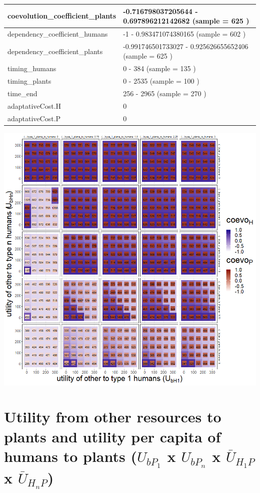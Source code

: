 \documentclass[
]{book}
\begin{document}
\begin{table}[!h]
\begin{tabular}[t]{l|l}
\hline
coevolution\_coefficient\_plants & -0.716798037205644 - 0.697896212142682 (sample = 625 )\\
\hline
dependency\_coefficient\_humans & -1 - 0.983471074380165 (sample = 602 )\\
\hline
dependency\_coefficient\_plants & -0.991746501733027 - 0.925626655652406 (sample = 625 )\\
\hline
timing\_humans & 0 - 384 (sample = 135 )\\
\hline
timing\_plants & 0 - 2535 (sample = 100 )\\
\hline
time\_end & 256 - 2965 (sample = 270 )\\
\hline
adaptativeCost.H & 0\\
\hline
adaptativeCost.P & 0\\
\hline
\end{tabular}
\end{table}

\newpage

\includegraphics[width=1\linewidth]{plots/4_exp_utilities_to_humans-tripleRaster_fourParameterss}

\newpage

\hypertarget{utility-from-other-resources-to-plants-and-utility-per-capita-of-humans-to-plants-u_bp_1-x-u_bp_n-x-baru_h_1p-x-baru_h_np}{%
\section{\texorpdfstring{Utility from other resources to plants and utility per capita of humans to plants (\(U_{bP_{1}}\) x \(U_{bP_{n}}\) x \(\bar{U}_{H_{1}P}\) x \(\bar{U}_{H_{n}P}\))}{Utility from other resources to plants and utility per capita of humans to plants (U\_\{bP\_\{1\}\} x U\_\{bP\_\{n\}\} x \textbackslash bar\{U\}\_\{H\_\{1\}P\} x \textbackslash bar\{U\}\_\{H\_\{n\}P\})}}\label{utility-from-other-resources-to-plants-and-utility-per-capita-of-humans-to-plants-u_bp_1-x-u_bp_n-x-baru_h_1p-x-baru_h_np}}
\end{document}
